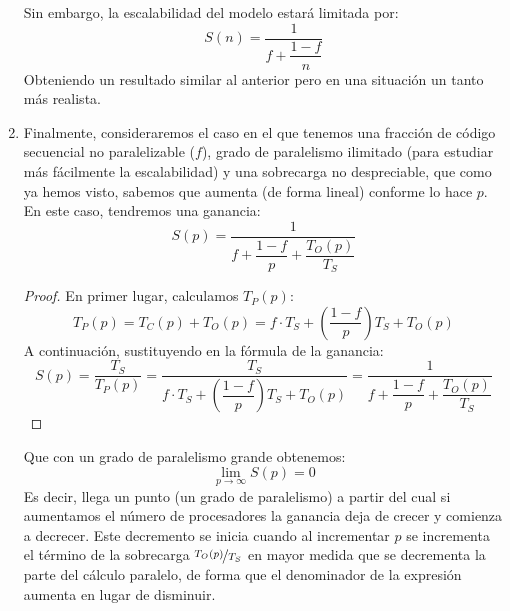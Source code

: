 \begin{enumerate}
        Sin embargo, la escalabilidad del modelo estará limitada por:
        \begin{equation*}
            S(n) = \dfrac{1}{f+\dfrac{1-f}{n}}
        \end{equation*}
        Obteniendo un resultado similar al anterior pero en una situación un tanto más realista.
    \item Finalmente, consideraremos el caso en el que tenemos una fracción de código secuencial no paralelizable ($f$), grado de paralelismo ilimitado (para estudiar más fácilmente la escalabilidad) y una sobrecarga no despreciable, que como ya hemos visto, sabemos que aumenta (de forma lineal) conforme lo hace $p$. En este caso, tendremos una ganancia:
        \begin{equation*}
            S(p) = \dfrac{1}{f+\dfrac{1-f}{p}+\dfrac{T_O(p)}{T_S}}
        \end{equation*}
        \begin{proof}
            En primer lugar, calculamos $T_P(p)$:
            \begin{equation*}
                T_P(p) = T_C(p) + T_O(p) = f\cdot T_S + \left(\dfrac{1-f}{p}\right)T_S + T_O(p)
            \end{equation*}
            A continuación, sustituyendo en la fórmula de la ganancia:
            \begin{equation*}
                S(p) = \dfrac{T_S}{T_P(p)} = \dfrac{T_S}{f\cdot T_S + \left(\dfrac{1-f}{p}\right)T_S + T_O(p)} = \dfrac{1}{f+\dfrac{1-f}{p} + \dfrac{T_O(p)}{T_S}}
            \end{equation*}
        \end{proof}
        
        Que con un grado de paralelismo grande obtenemos:
        \begin{equation*}
            \lim_{p\to\infty}S(p) = 0
        \end{equation*}
        Es decir, llega un punto (un grado de paralelismo) a partir del cual si aumentamos el número de procesadores la ganancia deja de crecer y comienza a decrecer. Este decremento se inicia cuando al incrementar $p$ se incrementa el término de la sobrecarga $\nicefrac{T_O(p)}{T_S}$ en mayor medida que se decrementa la parte del cálculo paralelo, de forma que el denominador de la expresión aumenta en lugar de disminuir.
\end{enumerate}

